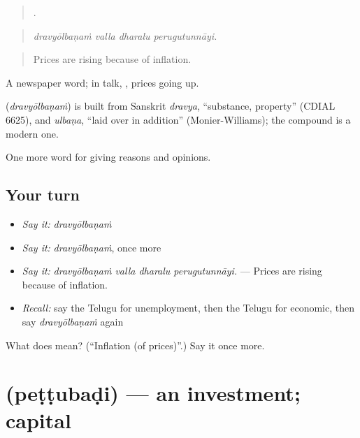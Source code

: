 \begin{quote}
   .
\end{quote}

\begin{quote}
\emph{dravyōlbaṇaṁ valla dharalu perugutunnāyi.}
\end{quote}

\begin{quote}
Prices are rising because of inflation.
\end{quote}

A newspaper word; in talk,  , prices going up.

\begin{cousinweb}
\textbf{} (\emph{dravyōlbaṇaṁ}) is built from Sanskrit \emph{dravya}, \textquotedblleft{}substance, property\textquotedblright{} (CDIAL 6625), and \emph{ulbaṇa}, \textquotedblleft{}laid over in addition\textquotedblright{} (Monier-Williams); the compound is a modern one.
\end{cousinweb}

\begin{grammarlens}[title={What you've built}]
One more word for giving reasons and opinions.
\end{grammarlens}

\subsection*{Your turn}
\begin{itemize}
\raggedright
  \item \emph{Say it:} \emph{dravyōlbaṇaṁ}
  \item \emph{Say it:} \emph{dravyōlbaṇaṁ}, once more
  \item \emph{Say it:} \emph{dravyōlbaṇaṁ valla dharalu perugutunnāyi.} — Prices are rising because of inflation.
  \item \emph{Recall:} say the Telugu for unemployment, then the Telugu for economic, then say \emph{dravyōlbaṇaṁ} again
\end{itemize}

\begin{tcolorbox}[breakable,colback=teal!4,colframe=teal!35!black,title={Before you move on}]
What does  mean? (\textquotedblleft{}Inflation (of prices)\textquotedblright{}.) Say it once more.
\end{tcolorbox}
\section[\texorpdfstring{\te{పెట్టుబడి} (peṭṭubaḍi)}{పెట్టుబడి (peṭṭubaḍi)}]{ (peṭṭubaḍi) — an investment; capital}

